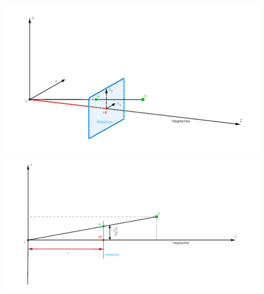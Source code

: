 	\begin{minipage}{\linewidth}
	\centering
	\includegraphics[width=.8\linewidth]{images/PinholeCameraModell3D.png}
	\label{fig:PinholeCamera3D}
\end{minipage}


	\begin{minipage}{\linewidth}
	\centering
	\includegraphics[width=.8\linewidth]{images/PinholeCameraModell2D.png}
	\label{fig:PinholeCamera2D}
	\end{minipage}\\ \\

